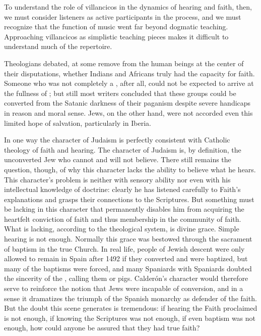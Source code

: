 



To understand the role of villancicos in the dynamics of hearing and faith,
then, we must consider listeners as active participants in the process, and we
must recognize that the function of music went far beyond dogmatic teaching.
Approaching villancicos as simplistic teaching pieces makes it difficult to
understand much of the repertoire.



 Theologians debated, at some remove from the human beings at the center of 
their disputations, whether Indians and Africans truly had the capacity for 
faith.
Someone who was not completely a , after all, could not be expected 
to arrive at the fullness of ; but still most writers concluded 
that these groups could be converted from the Satanic darkness of their 
paganism despite severe handicaps in reason and moral sense.
Jews, on the other hand, were not accorded even this limited hope of salvation, 
particularly in Iberia.


In one way the character of Judaism is perfectly consistent with Catholic 
theology of faith and hearing.
The character of Judaism is, by definition, the unconverted Jew who cannot and
will not believe.
There still remains the question, though, of why this character lacks the
ability to believe what he hears.
This character's problem is neither with sensory ability nor even with his
intellectual knowledge of doctrine: clearly he has listened carefully to Faith's
explanations and grasps their connections to the Scriptures.
But something must be lacking in this character that permanently disables him 
from acquiring the heartfelt conviction of faith and thus membership in the 
community of faith.
What is lacking, according to the theological system, is divine grace.
Simple hearing is not enough.
Normally this grace was bestowed through the sacrament of baptism in the true
Church.
In real life, people of Jewish descent were only allowed to remain in Spain
after 1492 if they converted and were baptized, but many of the baptisms were
forced, and many Spaniards with  Spaniards doubted the
sincerity of the , calling them  or pigs.%
    \Autocite[]{NewCatholic}
Calderón's character would therefore serve to reinforce the notion that Jews
were incapable of conversion, and in a sense it dramatizes the triumph of the Spanish
monarchy as defender of the faith.
But the doubt this scene generates is tremendous: if hearing the Faith
proclaimed is not enough, if knowing the Scriptures was not enough, if even
baptism was not enough, how could anyone be assured that they had true faith?


